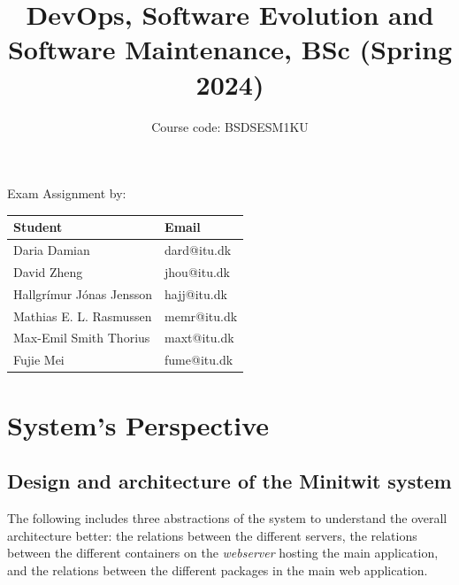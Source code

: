 \documentclass[12pt, a4paper, oneside]{book}
\title{DevOps, Software Evolution and Software Maintenance, BSc (Spring 2024)}
\author{Course code: BSDSESM1KU}
\begin{document}
\begin{minipage}{\textwidth}
\maketitle

\begin{center}
    Exam Assignment by: \\
    \hfill \break
    \bgroup
    \def\arraystretch{1.5}%
    \begin{tabularx}{0.8\textwidth} { 
      | >{\centering\arraybackslash}X 
      | >{\centering\arraybackslash}X | }
     \hline
     \cellcolor[HTML]{EFEFEF} Student & \cellcolor[HTML]{EFEFEF} Email \\
     \hline
     Daria Damian & dard@itu.dk \\
     \hline
     David Zheng & jhou@itu.dk \\
     \hline
     Hallgrímur Jónas Jensson & hajj@itu.dk \\
    \hline
     Mathias E. L. Rasmussen & memr@itu.dk \\
    \hline
     Max-Emil Smith Thorius & maxt@itu.dk \\
    \hline
    Fujie Mei & fume@itu.dk \\
    \hline
    \end{tabularx}
    \egroup
\end{center}
\end{minipage}

\tableofcontents

\chapter{System's Perspective}
\label{chap:System's Perspective}

\section{Design and architecture of the Minitwit system}
\label{sec:Design and architecture of the Minitwit system}

The following includes three abstractions of the system to understand the overall architecture better: the relations between the different servers, the relations between the different containers on the \textit{webserver} hosting the main application, and the relations between the different packages in the main web application.
\end{document}
